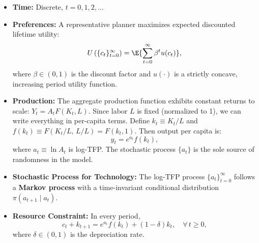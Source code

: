 \begin{itemize}
    \item \textbf{Time:} Discrete, $t = 0, 1, 2, \ldots$
    \item \textbf{Preferences:} A representative planner maximizes expected discounted lifetime utility:
    $$
    U\left(\{c_t\}_{t=0}^\infty\right) = \E{\sum_{t=0}^{\infty} \beta^t u(c_t)},
    $$
    where $\beta \in (0,1)$ is the discount factor and $u(\cdot)$ is a strictly concave, increasing period utility function.
    \item \textbf{Production:} The aggregate production function exhibits constant returns to scale: $Y_t = A_t F(K_t, L)$. Since labor $L$ is fixed (normalized to 1), we can write everything in per-capita terms. Define $k_t \equiv K_t / L$ and $f(k_t) \equiv F(K_t/L,\, L/L) = F(k_t, 1)$. Then output per capita is:
    $$
    y_t = e^{a_t} f(k_t),
    $$
    where $a_t \equiv \ln A_t$ is log-TFP. The stochastic process $\{a_t\}$ is the sole source of randomness in the model.
    \item \textbf{Stochastic Process for Technology:} The log-TFP process $\{a_t\}_{t=0}^\infty$ follows a \textbf{Markov process} with a time-invariant conditional distribution $\pi(a_{t+1} \mid a_t)$. 
    
    \item \textbf{Resource Constraint:} In every period,
    $$
    c_t + k_{t+1} = e^{a_t} f(k_t) + (1-\delta) k_t, \quad \forall\, t \geq 0,
    $$
    where $\delta \in (0,1)$ is the depreciation rate.
\end{itemize}


